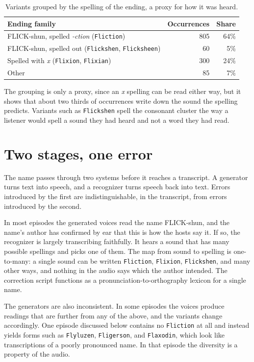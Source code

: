 \documentclass[11pt]{article}
\begin{document}
\begin{table}[h]
\centering
\begin{tabular}{lrr}
\toprule
Ending family & Occurrences & Share \\
\midrule
FLICK-shun, spelled \emph{-ction} (\texttt{Fliction}) & 805 & 64\% \\
FLICK-shun, spelled out (\texttt{Flickshen}, \texttt{Flicksheen}) & 60 & 5\% \\
Spelled with \emph{x} (\texttt{Flixion}, \texttt{Flixian}) & 300 & 24\% \\
Other & 85 & 7\% \\
\bottomrule
\end{tabular}
\caption{Variants grouped by the spelling of the ending, a proxy for how it was heard.}
\end{table}

The grouping is only a proxy, since an \emph{x} spelling can be read either way, but it shows that about two thirds of occurrences write down the sound the spelling predicts. Variants such as \texttt{Flickshen} spell the consonant cluster the way a listener would spell a sound they had heard and not a word they had read.

\section{Two stages, one error}

The name passes through two systems before it reaches a transcript. A generator turns text into speech, and a recognizer turns speech back into text. Errors introduced by the first are indistinguishable, in the transcript, from errors introduced by the second.

In most episodes the generated voices read the name FLICK-shun, and the name's author has confirmed by ear that this is how the hosts say it. If so, the recognizer is largely transcribing faithfully. It hears a sound that has many possible spellings and picks one of them. The map from sound to spelling is one-to-many: a single sound can be written \texttt{Fliction}, \texttt{Flixion}, \texttt{Flickshen}, and many other ways, and nothing in the audio says which the author intended. The correction script functions as a pronunciation-to-orthography lexicon for a single name.

The generators are also inconsistent. In some episodes the voices produce readings that are further from any of the above, and the variants change accordingly. One episode discussed below contains no \texttt{Fliction} at all and instead yields forms such as \texttt{Flyluzen}, \texttt{Fligerson}, and \texttt{Flaxodin}, which look like transcriptions of a poorly pronounced name. In that episode the diversity is a property of the audio.
\end{document}

